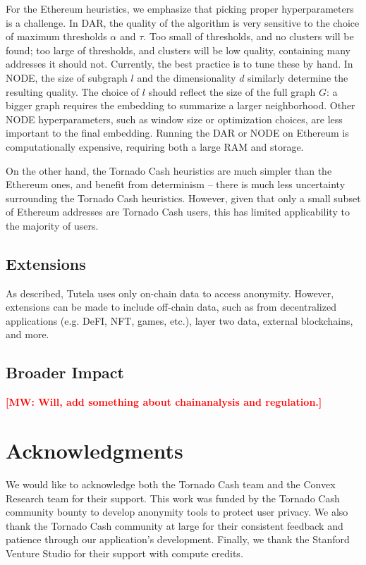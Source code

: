 \documentclass[11pt,a4paper]{article}
\newcommand{\mike}[1]{\textcolor{red}{\bf [MW: #1]}}
\begin{document}
For the Ethereum heuristics, we emphasize that picking proper hyperparameters is a challenge. In DAR, the quality of the algorithm is very sensitive to the choice of maximum thresholds $\alpha$ and $\tau$. Too small of thresholds, and no clusters will be found; too large of thresholds, and clusters will be low quality, containing many addresses it should not. Currently, the best practice is to tune these by hand. In NODE, the size of subgraph $l$ and the dimensionality $d$ similarly determine the resulting quality. The choice of $l$ should reflect the size of the full graph $G$: a bigger graph requires the embedding to summarize a larger neighborhood. Other NODE hyperparameters, such as window size or optimization choices, are less important to the final embedding. Running the DAR or NODE on Ethereum is computationally expensive, requiring both a large RAM and storage.

On the other hand, the Tornado Cash heuristics are much simpler than the Ethereum ones, and benefit from  determinism -- there is much less uncertainty surrounding the Tornado Cash heuristics.
However, given that only a small subset of Ethereum addresses are Tornado Cash users, this has limited applicability to the majority of users.

\subsection{Extensions}

As described, Tutela uses only on-chain data to access anonymity. However, extensions can be made to include off-chain data, such as from decentralized applications (e.g. DeFI, NFT, games, etc.), layer two data, external blockchains, and more.

\subsection{Broader Impact}

\mike{Will, add something about chainanalysis and regulation.}

\section*{Acknowledgments}
We would like to acknowledge both the Tornado Cash team and the Convex Research team for their support. This work was funded by the Tornado Cash community bounty to develop anonymity tools to protect user privacy. We also thank the Tornado Cash community at large for their consistent feedback and patience through our application's development. Finally, we thank the Stanford Venture Studio for their support with compute credits.



\end{document}
